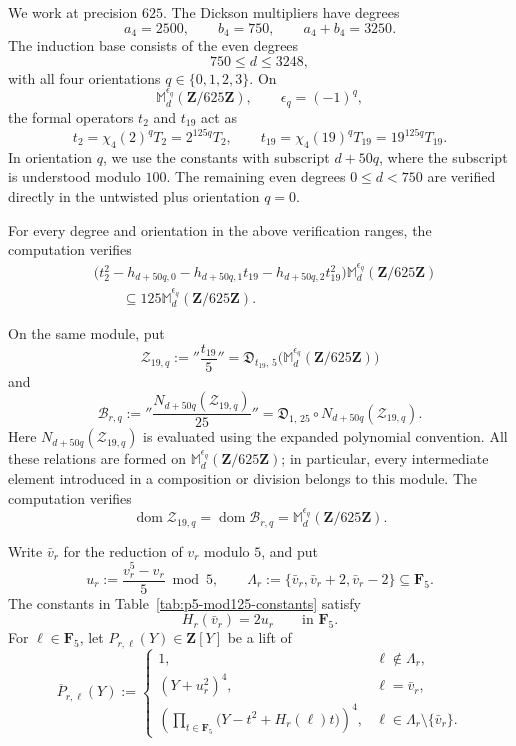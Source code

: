 \documentclass[11pt]{article}
\theoremstyle{plain}
\theoremstyle{definition}
\theoremstyle{remark}
\numberwithin{equation}{section}
\begin{document}
We work at precision \(625\). The Dickson multipliers have degrees \[ a_4=2500,\qquad b_4=750,\qquad a_4+b_4=3250. \] The induction base consists of the even degrees \[ 750\leq d\leq3248, \] with all four orientations \(q\in\{0,1,2,3\}\). On \[ \mathbb M_d^{\epsilon_q}(\mathbf Z/625\mathbf Z), \qquad \epsilon_q=(-1)^q, \] the formal operators \(t_2\) and \(t_{19}\) act as \[ t_2=\chi_4(2)^qT_2=2^{125q}T_2, \qquad t_{19}=\chi_4(19)^qT_{19}=19^{125q}T_{19}. \] In orientation \(q\), we use the constants with subscript \(d+50q\), where the subscript is understood modulo \(100\). The remaining even degrees \(0\leq d<750\) are verified directly in the untwisted plus orientation \(q=0\).

For every degree and orientation in the above verification ranges, the computation \cite[\href{https://github.com/nrustom/hecke-congruences/blob/main/playground_mod_125.ipynb}{\nolinkurl{playground_mod_125.ipynb}}] {RustomHeckeCongruences} verifies \begin{equation} \begin{aligned} &\bigl(t_2^2-h_{d+50q,0} -h_{d+50q,1}t_{19}-h_{d+50q,2}t_{19}^2\bigr) \mathbb M_d^{\epsilon_q}(\mathbf Z/625\mathbf Z)\\ &\qquad\subseteq 125\mathbb M_d^{\epsilon_q}(\mathbf Z/625\mathbf Z). \end{aligned} \label{eq:p5-mod125-joint-source} \end{equation}

On the same module, put \[ \mathcal Z_{19,q}:= ''\frac{t_{19}}5'' = \mathfrak D_{t_{19},\,5} \bigl(\mathbb M_d^{\epsilon_q}(\mathbf Z/625\mathbf Z)\bigr) \] and \[ \mathcal B_{r,q}:= ''\frac{N_{d+50q}(\mathcal Z_{19,q})}{25}'' = \mathfrak D_{1,\,25}\circ N_{d+50q}(\mathcal Z_{19,q}). \] Here \(N_{d+50q}(\mathcal Z_{19,q})\) is evaluated using the expanded polynomial convention. All these relations are formed on \(\mathbb M_d^{\epsilon_q}(\mathbf Z/625\mathbf Z)\); in particular, every intermediate element introduced in a composition or division belongs to this module. The computation verifies \begin{equation} \operatorname{dom}\mathcal Z_{19,q} = \operatorname{dom}\mathcal B_{r,q} = \mathbb M_d^{\epsilon_q}(\mathbf Z/625\mathbf Z). \label{eq:p5-mod125-full-domain}
\end{equation}

Write \(\bar v_r\) for the reduction of \(v_r\) modulo \(5\), and put \[ u_r:=\frac{v_r^5-v_r}{5}\bmod5,\qquad \Lambda_r:=\{\bar v_r,\bar v_r+2,\bar v_r-2\} \subseteq\mathbf F_5. \] The constants in Table~\ref{tab:p5-mod125-constants} satisfy \[ H_r(\bar v_r)=2u_r \qquad\text{in }\mathbf F_5. \] For \(\ell\in\mathbf F_5\), let \(P_{r,\ell}(Y)\in\mathbf Z[Y]\) be a lift of \[ \overline{P}_{r,\ell}(Y):= \begin{cases} 1,&\ell\notin\Lambda_r,\\ (Y+u_r^2)^4,&\ell=\bar v_r,\\ \displaystyle\left( \prod_{t\in\mathbf F_5} \bigl(Y-t^2+H_r(\ell)t\bigr) \right)^4, &\ell\in\Lambda_r\setminus\{\bar v_r\}. \end{cases}\]
\end{document}
